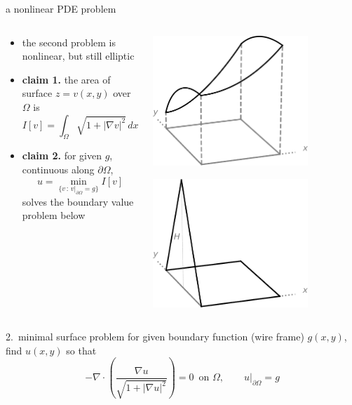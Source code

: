 \documentclass[10pt,
               svgnames,
               hyperref={colorlinks,citecolor=DeepPink4,linkcolor=FireBrick,urlcolor=Maroon},
               usepdftitle=false]{beamer}
\newcommand{\grad}{\nabla}
\newcommand{\Div}{\nabla \cdot}
\begin{document}
\begin{frame}{a nonlinear PDE problem}

\begin{columns}
\begin{column}{0.7\textwidth}
\begin{itemize}
\item the second problem is nonlinear, but still elliptic
\item \textbf{claim 1.} the area of surface $z=v(x,y)$ over $\Omega$ is
    $$I[v] = \int_\Omega \sqrt{1 + |\grad v|^2}\,dx\,dy$$
\item \textbf{claim 2.} for given $g$, continuous along $\partial\Omega$,
    $$u = \min_{\{v \,:\, v|_{\partial \Omega} = g\}} I[v]$$
solves the boundary value problem below
\end{itemize}
\end{column}
\begin{column}{0.3\textwidth}
\hfill \includegraphics[width=0.75\textwidth]{images/catenary.png}

\hfill \includegraphics[width=0.75\textwidth]{images/tent.png}
\end{column}
\end{columns}

\medskip
\begin{block}{2.~minimal surface problem} for given boundary function (wire frame) $g(x,y)$, find $u(x,y)$ so that
    $$-\Div \left(\frac{\grad u}{\sqrt{1 + |\grad u|^2}}\right) = 0 \, \text{ on } \Omega, \qquad u\big|_{\partial \Omega} = g$$
\end{block}
\end{frame}
\end{document}
